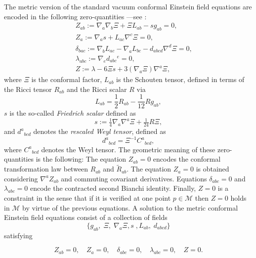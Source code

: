 \documentclass[10pt,a4paper]{article}
\theoremstyle{plain}
\begin{document}
The metric version of the standard vacuum conformal 
Einstein field equations are encoded in the following zero-quantities
  ---see \cite{Fri81a,Fri81b,Fri82,Fri83}:
\begin{subequations}\label{CFE_tensor_zeroquants}
\begin{eqnarray}
&& Z_{ab} := \nabla_{a}\nabla_{b}\Xi  +\Xi L_{ab} - s g_{ab}=0 ,
 \label{StandardCEFEsecondderivativeCF}\\
&& Z_{a} := \nabla_{a}s +L_{ac} \nabla ^{c}\Xi=0 , \label{standardCEFEs}\\
&& \delta_{bac} := \nabla_{b}L_{ac}-\nabla_{a}L_{bc} -
 d_{abcd}\nabla^d{}\Xi =0 , \label{standardCEFESchouten}\\
&& \lambda_{abc}:= \nabla_{e}d_{abc}{}^{e}=0 , \label{standardCEFErescaledWeyl}\\
&& Z := \lambda - 6 \Xi s + 3 (\nabla_{a}\Xi) \nabla^{a}\Xi,
\label{standardCFEconstraintFriedrichScalar}
\end{eqnarray}
\end{subequations}
where $\Xi$ is the conformal factor, $L_{ab}$ is the Schouten tensor,
defined in terms of the Ricci tensor $R_{ab}$ and the Ricci scalar $R$
via
\begin{equation}\label{SchoutenDefinition}
L_{ab}=\frac{1}{2}R_{ab}-\frac{1}{12}Rg_{ab},
\end{equation}
 $s$ is the so-called \emph{Friedrich scalar} defined as
\begin{equation}\label{s-definition}
s:= \tfrac{1}{4}\nabla_{a}\nabla^{a}\Xi + \tfrac{1}{24}R\Xi,
\end{equation}
and $d^{a}{}_{bcd}$ denotes the \emph{rescaled Weyl tensor}, defined
as
\[d^{a}{}_{bcd}=\Xi^{-1}C^{a}{}_{bcd},\]
where $C^{a}{}_{bcd}$ denotes the Weyl tensor.  The geometric meaning
of these zero-quantities is the following: The equation $Z_{ab}=0$
encodes the conformal transformation law between ${R}_{ab}$ and
$\tilde{R}_{ab}$.  The equation $Z_{a}=0$ is obtained considering
$\nabla^{a}Z_{ab}$ and commuting covariant derivatives.  Equations
$\delta_{abc}=0$ and $\lambda_{abc}=0$ encode the contracted second
Bianchi identity. Finally, $Z=0$ is a constraint in the sense that if
it is verified at one point $p\in\mathcal{M}$ then $Z=0$ holds in
$\mathcal{M}$ by virtue of the previous equations.  A solution to the
metric conformal Einstein field equations consist of a collection of
fields
\[
\{g_{ab}, \; \Xi, \; \nabla_{a}\Xi,s\;,L_{ab},\; d_{abcd}\}
\]
satisfying

\begin{equation}\label{vanishing_CFEs_tensorial_zq}
  Z_{ab}=0, \quad Z_{a}=0, \quad \delta_{abc}=0, \quad \lambda_{abc}=0, \quad Z=0.
\end{equation}
\end{document}
